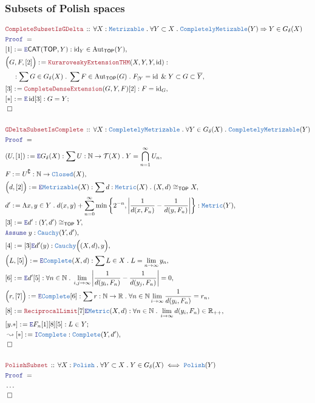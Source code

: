 \documentclass[12pt]{scrartcl}
\newcommand{\TYPE}[1]{\textcolor{NavyBlue}{\mathtt{#1}}}
\newcommand{\LOGIC}[1]{\textcolor{Blue}{\mathtt{#1}}}
\newcommand{\THM}[1]{\textcolor{Maroon}{\mathtt{#1}}}
\renewcommand{\.}{\; . \;}
\newcommand{\de}{: \kern 0.1pc =}
\newcommand{\Theorem}[2]{& \THM{#1} \, :: \, #2 \\ & \Proof = \\ }
\newcommand{\NewLine}{\\ & \kern 1pc}
\newcommand{\Page}[1]{ \begin{align*} #1 \end{align*}   }
\newcommand{\NoProof}{ & \ldots \\ \EndProof}
\renewcommand{\And}{\; \& \;}
\newcommand{\Imply}{\Rightarrow}
\newcommand{\Intro}{\LOGIC{I}}
\newcommand{\Elim}{\LOGIC{E}}
\newcommand{\Reals}{\mathbb{R} }
\newcommand{\Nat}{\mathbb{N} }
\DeclareMathOperator*{\id}{id}
\newcommand{\Aut}{\mathrm{Aut}}
\renewcommand{\c}{\complement}
\newcommand{\Say}[3]{& #1 \de #2 : #3, \\}
\newcommand{\Conclude}[3]{& #1 \de #2 : #3; \\}
\newcommand{\Derive}[3]{& \leadsto #1 \de #2 : #3, \\}
\newcommand{\Assume}[2]{& \LOGIC{Assume} \; #1 : #2, \\}
\newcommand{\QED}{\; \square}
\newcommand{\EndProof}{& \QED \\}
\newcommand{\Proof}{\LOGIC{Proof} \; }
\newcommand{\CAT}{\mathsf{CAT}}
\newcommand{\TOP}{\mathsf{TOP}}
\newcommand{\T}{\mathcal{T}}
\newcommand{\Polish}{\TYPE{Polish}}
\begin{document}
\subsubsection{Subsets of Polish spaces}
\Page{
	\Theorem{CompleteSubsetIsGDelta}
	{
		\forall X : \TYPE{Metrizable} \.
		\forall Y \subset X \.
		\TYPE{CompletelyMetizable}(Y) \Imply
		Y \in G_\delta(X)
	}
	\Say{[1]}{\Elim \CAT( \TOP,Y)}{{\id}_Y \in \Aut_{\TOP}(Y)}
	\Say{\Big(G,F,[2]\Big)}{\THM{KuraroveskyExtensionTHM}(X,Y,Y,\id)}
	{
		\NewLine : 
		\sum G \in G_\delta(X) \. 
		\sum F \in \Aut_\TOP(G) \.
		F_{|Y} = \id \And  Y \subset G \subset \overline{Y}
	}
	\Say{[3]}{\THM{CompleteDenseExtension}(G,Y,F)[2]}{F = {\id}_G}
	\Conclude{[*]}{\Elim \id [3]}{G=Y}
	\EndProof
	\\
	\Theorem{GDeltaSubsetIsComplete}
	{
		\forall X  : \TYPE{CompletelyMetrizable} \.
		\forall Y \in G_\delta(X) \.
		\TYPE{CompletelyMetrizable}(Y)
	}
	\Say{(U,[1])}
	{
		\Elim G_\delta(X)
	}
	{
		\sum U : \Nat \to \T(X) \. 
		Y = \bigcap^\infty_{n=1} U_n
	}
	\Say{F}{U^\c}{\Nat \to \TYPE{Closed}(X)}
	\Say{\Big(d,[2]\Big)}{\Elim \TYPE{Metrizable}(X)}
	{
		\sum d : \TYPE{Metric}(X) \.
		(X,d) \cong_\TOP X
	}
	\Say{d'}{ 
		\Lambda x,y \in Y \. 
		d(x,y) + \sum^\infty_{n=0} \min \left\{ 2^{-n} ,  \left| \frac{1}{d(x,F_n)} - \frac{1}{d(y,F_n)} \right|\right\} 
	}
	{
		\TYPE{Metric}(Y)
	}
	\Say{[3]}{\Elim d'}{(Y,d') \cong_\TOP Y }
	\Assume{y}{\TYPE{Cauchy}(Y,d')}
	\Say{[4]}{[3]\Elim d' (y)}{\TYPE{Cauchy}\Big((X,d),y\Big)}
	\Say{\Big(L,[5]\Big)}{\Elim \TYPE{Complete}(X,d)}
	{
		\sum L \in X \. L = \lim_{n \to \infty} y_n
	}
	\Say{[6]}{\Elim d' [5]}
	{
		\forall n \in \Nat \.
		\lim_{i,j \to \infty} \left| \frac{1}{d(y_i,F_n)} - \frac{1}{d(y_j,F_n)}  \right| = 0
	}
	\Say{\Big(r,[7]\Big)}{\Elim \TYPE{Complete}[6]}
	{
		\sum r : \Nat \to \Reals \.
		\forall n \in \Nat 
		\lim_{i \to \infty} \frac{1}{d(y_i,F_n)} = r_n
	}
	\Say{[8]}{\THM{ReciprocalLimit}[7]\Elim \TYPE{Metric}(X,d)}
	{
		\forall n \in \Nat \. \lim_{i \to \infty} d(y_i,F_n) \in \Reals_{++}
	}
	\Conclude{[y.*]}{\Elim F_n [1][8][5]}{ L \in Y }
	\Derive{[*]}{\Intro \TYPE{Complete}}{\TYPE{Complete}(Y,d')}
	\EndProof
	\\
	\Theorem{PolishSubset}
	{
		\forall X : \Polish \.
		\forall Y \subset X \.
		Y \in G_\delta(X) \iff \Polish(Y)
	}
	\NoProof
}
\newpage
\end{document}
